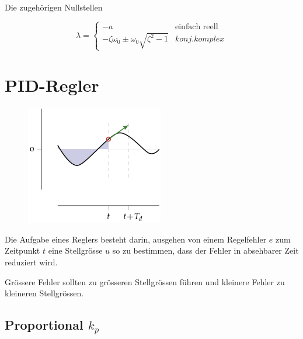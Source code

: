 \documentclass[
  10pt,
  a4paper,
  german]{article}
\numberwithin{equation}{section}
\begin{document}
\begin{multicols}{2}
Die zugehörigen Nullstellen

\[
\lambda = \left\{ \begin{matrix}
-a & \text{einfach reell} \\
-\zeta\omega_0 \pm \omega_0 \sqrt{\zeta^2-1} & konj. komplex
\end{matrix}\right.
\]

\hypertarget{pid-regler}{%
\section{PID-Regler}\label{pid-regler}}

\begin{figure}

{\centering \includegraphics[width=6cm,height=\textheight]{images/pid_regler/pid_graph.png}

}

\end{figure}

Die Aufgabe eines Reglers besteht darin, ausgehen von einem Regelfehler
\(e\) zum Zeitpunkt \(t\) eine Stellgrösse \(u\) so zu bestimmen, dass
der Fehler in absehbarer Zeit reduziert wird.

\begin{tcolorbox}[enhanced jigsaw, rightrule=.15mm, toprule=.15mm, leftrule=.75mm, opacityback=0, title=\textcolor{quarto-callout-note-color}{\faInfo}\hspace{0.5em}{Verhalten Regler}, opacitybacktitle=0.6, colback=white, arc=.35mm, bottomrule=.15mm, colframe=quarto-callout-note-color-frame, coltitle=black, bottomtitle=1mm, left=2mm, toptitle=1mm, breakable, titlerule=0mm, colbacktitle=quarto-callout-note-color!10!white]

Grössere Fehler sollten zu grösseren Stellgrössen führen und kleinere
Fehler zu kleineren Stellgrössen.

\end{tcolorbox}

\hypertarget{k_p}{%
\subsection{\texorpdfstring{\textcolor{BrickRed}{Proportional}
\(k_p\)}{ k\_p}}\label{k_p}}


\end{multicols}
\end{document}
